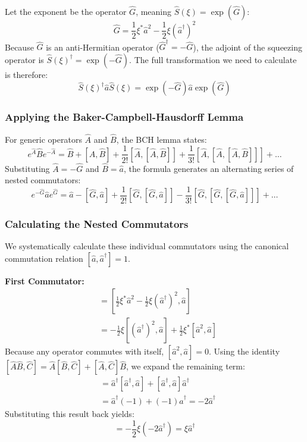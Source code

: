 Let the exponent be the operator $\hat{G}$, meaning $\hat{S}(\xi) = \exp(\hat{G})$:
\begin{equation*}
\hat{G} = \frac{1}{2}\xi^*\hat{a}^2 - \frac{1}{2}\xi(\hat{a}^\dagger)^2
\end{equation*}
Because $\hat{G}$ is an anti-Hermitian operator ($\hat{G}^\dagger = -\hat{G}$), the adjoint of the squeezing operator is $\hat{S}(\xi)^\dagger = \exp(-\hat{G})$. The full transformation we need to calculate is therefore:
\begin{equation*}
\hat{S}(\xi)^\dagger \hat{a} \hat{S}(\xi) = \exp(-\hat{G}) \hat{a} \exp(\hat{G})
\end{equation*}

\subsubsection{Applying the Baker-Campbell-Hausdorff Lemma}
For generic operators $\hat{A}$ and $\hat{B}$, the BCH lemma states:
\begin{equation*}
e^{\hat{A}} \hat{B} e^{-\hat{A}} = \hat{B} + [\hat{A}, \hat{B}] + \frac{1}{2!}[\hat{A}, [\hat{A}, \hat{B}]] + \frac{1}{3!}[\hat{A}, [\hat{A}, [\hat{A}, \hat{B}]]] + \dots
\end{equation*}
Substituting $\hat{A} = -\hat{G}$ and $\hat{B} = \hat{a}$, the formula generates an alternating series of nested commutators:
\begin{equation*}
e^{-\hat{G}} \hat{a} e^{\hat{G}} = \hat{a} - [\hat{G}, \hat{a}] + \frac{1}{2!}[\hat{G}, [\hat{G}, \hat{a}]] - \frac{1}{3!}[\hat{G}, [\hat{G}, [\hat{G}, \hat{a}]]] + \dots
\end{equation*}

\subsubsection{Calculating the Nested Commutators}
We systematically calculate these individual commutators using the canonical commutation relation $[\hat{a}, \hat{a}^\dagger] = 1$.

\textbf{First Commutator:}
\begin{align*}
[\hat{G}, \hat{a}] &= \left[ \frac{1}{2}\xi^*\hat{a}^2 - \frac{1}{2}\xi(\hat{a}^\dagger)^2, \hat{a} \right] \\
&= -\frac{1}{2}\xi [(\hat{a}^\dagger)^2, \hat{a}] + \frac{1}{2}\xi^* [\hat{a}^2, \hat{a}]
\end{align*}
Because any operator commutes with itself, $[\hat{a}^2, \hat{a}] = 0$. Using the identity $[\hat{A}\hat{B}, \hat{C}] = \hat{A}[\hat{B}, \hat{C}] + [\hat{A}, \hat{C}]\hat{B}$, we expand the remaining term:
\begin{align*}
[(\hat{a}^\dagger)^2, \hat{a}] &= \hat{a}^\dagger[\hat{a}^\dagger, \hat{a}] + [\hat{a}^\dagger, \hat{a}]\hat{a}^\dagger \\
&= \hat{a}^\dagger(-1) + (-1)\hat{a}^\dagger = -2\hat{a}^\dagger
\end{align*}
Substituting this result back yields:
\begin{equation*}
[\hat{G}, \hat{a}] = -\frac{1}{2}\xi(-2\hat{a}^\dagger) = \xi\hat{a}^\dagger
\end{equation*}

